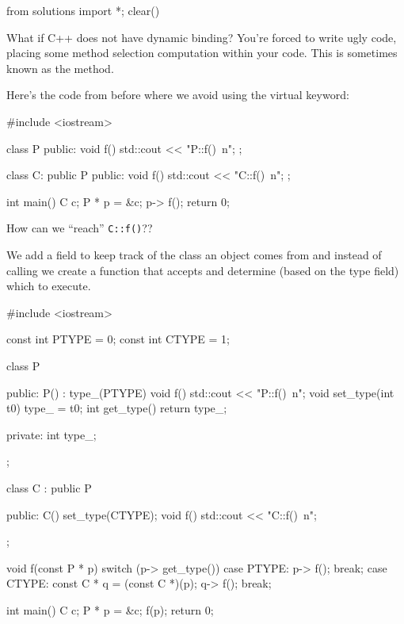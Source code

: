 \begin{python0}
from solutions import *; clear()
\end{python0}

What if C++ does not have dynamic binding? You're forced to write ugly code, placing some method selection computation within your code. This is sometimes known as the  method.

Here's the code from before where we avoid using the virtual keyword:

\begin{console}
#include <iostream>

class P
{
public:
     void f() { std::cout << "P::f()\ n"; }
};

class C: public P
{
public:
     void f() { std::cout << "C::f()\ n"; }
};

int main()
{   
    C c;
    P * p = &c;
    p-> f();
    return 0;
}
\end{console}

How can we ``reach'' \texttt{C::f()}??

We add a field to keep track of the class an object comes from and instead of calling we create a function that accepts and determine (based on the type field) which to execute.

\begin{console}
#include <iostream>

const int PTYPE = 0;
const int CTYPE = 1;

class P
{
public:
     P() : type_(PTYPE) {}
     void f() { std::cout << "P::f()\ n"; }
     void set_type(int t0) { type_ = t0; }
     int get_type() { return type_; }
     
private:
     int type_;

};

class C : public P
{
public:
     C() { set_type(CTYPE); }
     void f() { std::cout << "C::f()\ n"; }

};

void f(const P * p)
{    
     switch (p-> get_type())
     {    
          case PTYPE:
               p-> f();
               break;
          case CTYPE:
               const C * q = (const C *)(p);
               q-> f();
               break;
     }
}

int main()
{   
    C c;
    P * p = &c;
    f(p);
    return 0;
}
\end{console}


